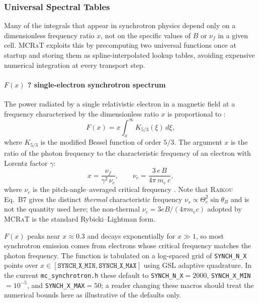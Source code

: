 \documentclass[12pt,a4paper]{article}
\newcommand{\nuf}{\nu_{\!f}}
\newcommand{\nuc}{\nu_c}
\newcommand{\code}[1]{\texttt{#1}}
\newcommand{\raikou}{\textsc{Raikou}}
\newcommand{\mcrat}{\textsc{MCRaT}}
\begin{document}
\subsubsection{Universal Spectral Tables}
\label{sec:tables}

Many of the integrals that appear in synchrotron physics depend only on a
dimensionless frequency ratio $x$, not on the specific values of $B$ or
$\nu_f$ in a given cell.  \mcrat{} exploits this by precomputing two
universal functions once at startup and storing them as spline-interpolated
lookup tables, avoiding expensive numerical integration at every transport
step.

\paragraph{\texorpdfstring{$F(x)$}{F(x)} ? single-electron synchrotron
	spectrum}
\label{sec:Fx}

The power radiated by a single relativistic electron in a magnetic field at
a frequency characterised by the dimensionless ratio $x$ is proportional to
\citep[\raikou{} Eq.~B13; R\&L79 Eq.~6.31]{kawashima2023,rybicki1979}:
\begin{equation}
	F(x) = x \int_x^{\infty} K_{5/3}(\xi)\,d\xi,
	\label{eq:Fx}
\end{equation}
where $K_{5/3}$ is the modified Bessel function of order $5/3$.  The
argument $x$ is the ratio of the photon frequency to the characteristic
frequency of an electron with Lorentz factor $\gamma$:
\begin{equation}
	x = \frac{\nuf}{\gamma^2\,\nuc}, \qquad
	\nuc = \frac{3\,e\,B}{4\pi\,m_e\,c},
	\label{eq:xdef}
\end{equation}
where $\nuc$ is the pitch-angle--averaged critical frequency
\citep[R\&L79 Eq.~6.17c, pitch-angle averaged]{rybicki1979}. Note that
\raikou{} Eq.~B7 gives the distinct \emph{thermal} characteristic
frequency $\nu_s\propto\Theta_e^2\sin\theta_B$ and is not the quantity
used here; the non-thermal $\nuc=3eB/(4\pi m_ec)$ adopted by \mcrat{}
is the standard Rybicki--Lightman form.

$F(x)$ peaks near $x \approx 0.3$ and decays exponentially for $x \gg 1$,
so most synchrotron emission comes from electrons whose critical frequency
matches the photon frequency.  The function is tabulated on a log-spaced
grid of \code{SYNCH\_N\_X} points over
$x \in [\code{SYNCH\_X\_MIN}, \code{SYNCH\_X\_MAX}]$ using GSL adaptive
quadrature. In the current \code{mc\_synchrotron.h} these default to
\code{SYNCH\_N\_X}$=2000$, \code{SYNCH\_X\_MIN}$=10^{-5}$, and
\code{SYNCH\_X\_MAX}$=50$; a reader changing these macros should treat the
numerical bounds here as illustrative of the defaults only.
\end{document}
